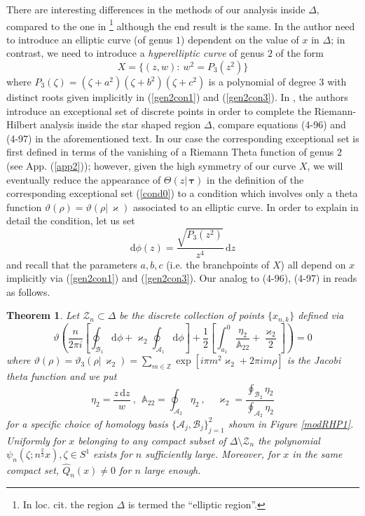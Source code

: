 \documentclass[10pt,oneside,reqno]{amsart}
\numberwithin{equation}{section}
\renewcommand{\d}{{\mathrm d}}
\newtheorem{theorem}{Theorem}[section]
\def\bth{\begin{theorem}}
\def\et{\end{theorem}}
\def\be{\begin{equation}}
\def\ee{\end{equation}}
\def\wh{\widehat}
\def\Z{{\mathbb Z}}
\def\z{\zeta}
\def\eqref#1{(\ref{#1})}
\begin{document}
There are interesting differences in the methods of our analysis inside $\Delta$, compared to the one in \cite{BM}\footnote{In loc. cit. the region $\Delta$ is termed the ``elliptic region''.} although the end result is the same. 
In \cite{BM} the author need to introduce an elliptic curve (of genus $1$) dependent on the value of $x$ in $\Delta$; in contrast, we need to introduce a {\em hyperelliptic curve} of genus $2$ of the form 
\be
X=\Big\{(z,w):\ w^2 =P_3\left(z^2\right)\Big\}%
\label{Rg2} 
\ee
where $P_3(\z)=(\z+a^2)(\z+b^2)(\z+c^2)$ is a polynomial of degree $3$ with distinct roots given implicitly in \eqref{gen2con1} and \eqref{gen2con3}.
In \cite{BM}, the authors introduce an exceptional set of discrete points in order to complete the Riemann-Hilbert analysis inside the star shaped region $\Delta$, compare equations (4-96) and (4-97) in the aforementioned text. 
In our case the corresponding exceptional set is first defined in terms of the vanishing of a Riemann Theta function of genus $2$ (see App. \eqref{app2}); however, 
 given the high symmetry of our curve $X$, we will eventually reduce the appearance of $\Theta(z|\,{\boldsymbol \tau})$ in the definition of the corresponding exceptional set \eqref{cond0} to a condition which involves only a theta function $\vartheta(\rho)=\vartheta(\rho|\,\varkappa)$ associated to an elliptic curve. In order to explain in detail the condition, let   us set 
\be
\d \phi(z)= \frac {\sqrt{P_3(z^2)} }{z^4}\, \d z
\ee
and recall that the parameters $a,b,c$ (i.e. the branchpoints of $X$)  all depend on $x$ implicitly via \eqref{gen2con1} and \eqref{gen2con3}. Our analog to (4-96), (4-97) in \cite{BM} reads as follows.
\bth
\label{theo3} 
Let $\mathcal Z_{n}\subset \Delta$ be the discrete collection of points $\{x_{n,k}\}$ defined
via
\be\label{th3zero}
 \vartheta\left(\frac{n}{2\pi i}\left[\oint_{\mathcal{B}_1}\d\phi+\varkappa_2\oint_{\mathcal{A}_1}\d\phi\right]
  +\frac{1}{2}\left[\int_{a_1}^0\frac{\eta_2}{\mathbb{A}_{22}}+\frac{\varkappa_2}{2}\right]\right)=0
\ee
where $\vartheta(\rho) = \vartheta_3(\rho|\,\varkappa_2)= \sum_{m\in \Z}\exp[i\pi m^2 \varkappa_2 + 2\pi i m \rho]$ is the Jacobi theta function and we put 
\be
\eta_2 = \frac {z\,\d z}{w}\ ,\ \ \mathbb A_{22} = \oint_{\mathcal A_2} \eta_2\ ,\ \ \ \ \ \varkappa_2= \frac {  \oint_{\mathcal B_2} \eta_2}{ \oint_{\mathcal A_2} \eta_2}
\ee
for a specific choice of homology basis $\{\mathcal{A}_j,\mathcal{B}_j\}_{j=1}^2$ shown in Figure \ref{modRHP1}. Uniformly for $x$ belonging to any compact subset of $\Delta \setminus \mathcal Z_{n}$ the polynomial $\psi_{n}(\zeta;n^\frac 23 x),\zeta\in S^1$ exists for $n$ sufficiently large. Moreover, for $x$ in the same compact set,  $\wh Q_n(x)\neq 0$ for $n$ large enough.
\et
\end{document}
